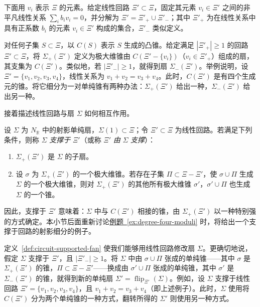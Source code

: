 下面用 $v_i$ 表示 $\Xi$ 的元素。给定线性回路 $\Xi'\subset\Xi$，固定其元素 $v_i\in\Xi'$ 之间的非平凡线性关系 $\sum_i b_i v_i=0$，并分解为 $\Xi'=\Xi'_+\cup\Xi'_-$；其中 $\Xi'_+$ 为在线性关系中具有正系数 $b_i$ 的元素 $v_i\in\Xi'$ 构成的集合，$\Xi'_-$ 类似定义。

对任何子集 $S\subset\Xi$，以 $C(S)$ 表示 $S$ 生成的凸锥。给定满足 $|\Xi'_+|\geq1$ 的回路 $\Xi'\subset\Xi$，将 $\Sigma_+(\Xi')$ 定义为极大维锥由 $C(\Xi'-\{v_i\})$（$v_i\in\Xi'_+$）组成的扇，其支集为 $C(\Xi')$。类似地，若 $|\Xi'_-|\geq1$，就得到扇 $\Sigma_-(\Xi')$。举例说明，设 $\Xi'=\{v_1,v_2,v_3,v_4\}$，线性关系为 $v_1+v_2=v_3+v_4$。此时，$C(\Xi')$ 是有四个生成元的锥。将它细分为一对单纯锥有两种办法：$\Sigma_+(\Xi')$ 给出一种，$\Sigma_-(\Xi')$ 给出另一种。

接着描述线性回路与扇 $\Sigma$ 如何相互作用。

\begin{definition}\label{def:circuit-supported-fan}
设 $\Sigma$ 为 $N_{\mathbb R}$ 中的射影单纯扇，$\Sigma(1)\subset\Xi$；令 $\Xi'\subset\Xi$ 为线性回路。若满足下列条件，则称 $\Sigma$ \emph{支撑于} $\Xi'$（或称 $\Xi'$ \emph{由} $\Sigma$ \emph{支撑}）：
\begin{enumerate}[label=(\roman*)]
\item $\Sigma_+(\Xi')$ 是 $\Sigma$ 的子扇。
\item 设 $\sigma$ 为 $\Sigma_+(\Xi')$ 的一个极大维锥。若存在子集 $\Pi\subset\Xi-\Xi'$，使 $\sigma\cup\Pi$ 生成 $\Sigma$ 的一个极大维锥，则对 $\Sigma_+(\Xi')$ 的其他所有极大维锥 $\sigma'$，$\sigma'\cup\Pi$ 也生成 $\Sigma$ 的一个锥。
\end{enumerate}
\end{definition}
因此，支撑于 $\Xi'$ 意味着：$\Sigma$ 中与 $C(\Xi')$ 相接的锥，由 $\Sigma_+(\Xi')$ 以一种特别强的方式确定。本小节后面重新讨论\hyperref[ex:degree-four-moduli]{例题~\ref*{ex:degree-four-moduli}} 时，将给出一个支撑于回路的射影细分的例子。

定义~\ref{def:circuit-supported-fan} 使我们能够用线性回路修改扇 $\Sigma$。更确切地说，假定 $\Sigma$ 支撑于 $\Xi'$，且 $|\Xi'_-|\geq1$。将 $\Sigma$ 中由 $\sigma\cup\Pi$ 张成的单纯锥——其中 $\sigma$ 是 $\Sigma_+(\Xi')$ 的锥，$\Pi\subset\Xi-\Xi'$——换成由 $\sigma'\cup\Pi$ 张成的单纯锥，其中 $\sigma'$ 是 $\Sigma_-(\Xi')$ 的锥，就得到新的单纯扇 $\Sigma'=\operatorname{flip}_{\Xi'}(\Sigma)$。例如，设 $\Sigma$ 支撑于线性回路 $\Xi'=\{v_1,v_2,v_3,v_4\}$，且 $v_1+v_2=v_3+v_4$（即上述例子）。此时，$\Sigma$ 使用将 $C(\Xi')$ 分为两个单纯锥的一种方式，翻转所得的 $\Sigma'$ 则使用另一种方式。

